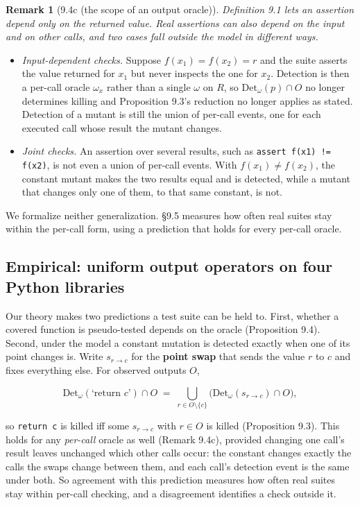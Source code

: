 \documentclass[conference]{IEEEtran}
\newcommand{\Det}{\mathrm{Det}}
\theoremstyle{run}
\newtheorem*{remark}{Remark}
\begin{document}
\begin{remark}[9.4c (the scope of an output oracle)]
Definition 9.1 lets an assertion depend only on the returned value. Real assertions can also depend on the input and on other calls, and two cases fall outside the model in different ways.
\end{remark}

\begin{itemize}
\item \emph{Input-dependent checks.} Suppose $f(x_1) = f(x_2) = r$ and the suite asserts the value returned for $x_1$ but never inspects the one for $x_2$. Detection is then a per-call oracle $\omega_x$ rather than a single $\omega$ on $R$, so $\Det_\omega(p) \cap O$ no longer determines killing and Proposition 9.3's reduction no longer applies as stated. Detection of a mutant is still the union of per-call events, one for each executed call whose result the mutant changes.
\item \emph{Joint checks.} An assertion over several results, such as \texttt{assert f(x1) != f(x2)}, is not even a union of per-call events. With $f(x_1) \neq f(x_2)$, the constant mutant makes the two results equal and is detected, while a mutant that changes only one of them, to that same constant, is not.
\end{itemize}

We formalize neither generalization. \S 9.5 measures how often real suites stay within the per-call form, using a prediction that holds for every per-call oracle.

\setcounter{subsection}{4}
\subsection{Empirical: uniform output operators on four Python libraries}
Our theory makes two predictions a test suite can be held to. First, whether a covered function is pseudo-tested depends on the oracle (Proposition 9.4). Second, under the model a constant mutation is detected exactly when one of its point changes is. Write $s_{r \to c}$ for the \textbf{point swap} that sends the value $r$ to $c$ and fixes everything else. For observed outputs $O$,

\[ \Det_\omega(\text{`return }c\text{'}) \cap O \;=\; \bigcup_{r \in O \setminus \{c\}} \big(\Det_\omega(s_{r\to c}) \cap O\big), \]

so \texttt{return c} is killed iff some $s_{r \to c}$ with $r \in O$ is killed (Proposition 9.3). This holds for any \emph{per-call} oracle as well (Remark 9.4c), provided changing one call's result leaves unchanged which other calls occur: the constant changes exactly the calls the swaps change between them, and each call's detection event is the same under both. So agreement with this prediction measures how often real suites stay within per-call checking, and a disagreement identifies a check outside it.
\end{document}
